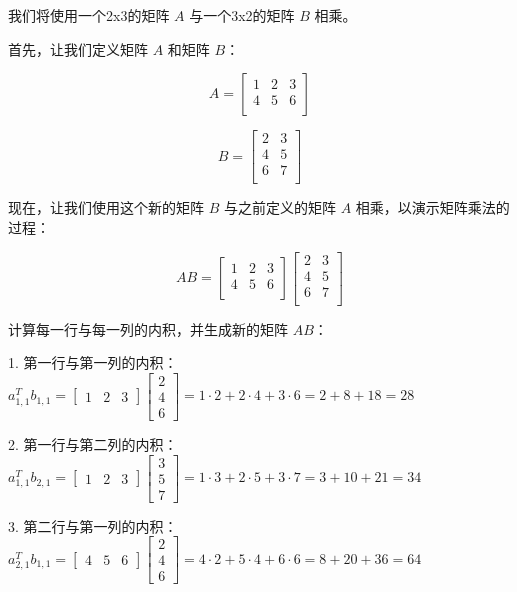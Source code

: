 \begin{exercise}
    我们将使用一个2x3的矩阵 $A$ 与一个3x2的矩阵 $B$ 相乘。

首先，让我们定义矩阵 $A$ 和矩阵 $B$：

\[
A = \begin{bmatrix}
1 & 2 & 3 \\
4 & 5 & 6 \\
\end{bmatrix}
\]

\[
B = \begin{bmatrix}
2 & 3 \\
4 & 5 \\
6 & 7 \\
\end{bmatrix}
\]

现在，让我们使用这个新的矩阵 $B$ 与之前定义的矩阵 $A$ 相乘，以演示矩阵乘法的过程：

\[
AB = \begin{bmatrix}
1 & 2 & 3 \\
4 & 5 & 6 \\
\end{bmatrix} \begin{bmatrix}
2 & 3 \\
4 & 5 \\
6 & 7 \\
\end{bmatrix}
\]

计算每一行与每一列的内积，并生成新的矩阵 $AB$：

1. 第一行与第一列的内积： $a_{1,1}^T b_{1,1} = \begin{bmatrix} 1 & 2 & 3 \end{bmatrix} \begin{bmatrix} 2 \\ 4 \\ 6 \end{bmatrix} = 1 \cdot 2 + 2 \cdot 4 + 3 \cdot 6 = 2 + 8 + 18 = 28$

2. 第一行与第二列的内积： $a_{1,1}^T b_{2,1} = \begin{bmatrix} 1 & 2 & 3 \end{bmatrix} \begin{bmatrix} 3 \\ 5 \\ 7 \end{bmatrix} = 1 \cdot 3 + 2 \cdot 5 + 3 \cdot 7 = 3 + 10 + 21 = 34$

3. 第二行与第一列的内积： $a_{2,1}^T b_{1,1} = \begin{bmatrix} 4 & 5 & 6 \end{bmatrix} \begin{bmatrix} 2 \\ 4 \\ 6 \end{bmatrix} = 4 \cdot 2 + 5 \cdot 4 + 6 \cdot 6 = 8 + 20 + 36 = 64$


\end{exercise}
